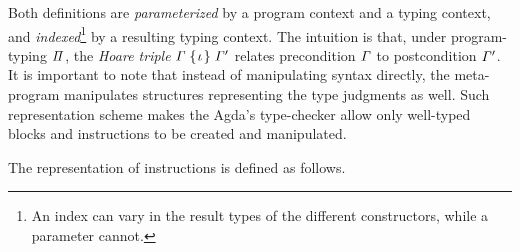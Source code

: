 \documentclass[sigconf]{acmart}
\theoremstyle{definition}
\newcommand{\V}[1]{\purple{\mathit{#1}}}
\begin{document}
Both definitions are \emph{parameterized} by a program context and a typing context, and \emph{indexed}\footnote{An index can vary in the result types of the different constructors, while a parameter cannot.} by a resulting typing context. The intuition is that, under program-typing \ensuremath{\V{\Pi}}, the \emph{Hoare triple} \ensuremath{\V{\Gamma}\;\{\mskip1.5mu \V{\iota}\mskip1.5mu\}\;\V{\Gamma'}} relates precondition \ensuremath{\V{\Gamma}} to postcondition \ensuremath{\V{\Gamma'}}. It is important to note that instead of manipulating syntax directly, the meta-program manipulates structures representing the type judgments as well. Such representation scheme makes the Agda's type-checker allow only well-typed blocks and instructions to be created and manipulated.

The representation of instructions is defined as follows.
\end{document}
